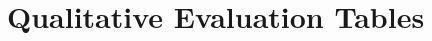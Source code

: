 \documentclass[11pt]{article}
\begin{document}
    

    \appendix
    \section{Qualitative Evaluation Tables}
    \label{app:qualitative}
%    
%    
    
\end{document}
